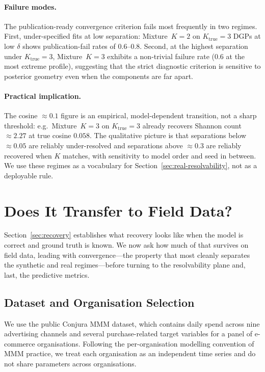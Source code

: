 \documentclass[11pt]{article}
\begin{document}
\paragraph{Failure modes.} The publication-ready convergence criterion fails most frequently in two regimes. First, under-specified fits at low separation: Mixture~$K=2$ on $K_{\text{true}}=3$ DGPs at low $\delta$ shows publication-fail rates of $0.6$--$0.8$. Second, at the highest separation under $K_{\text{true}}=3$, Mixture~$K=3$ exhibits a non-trivial failure rate ($0.6$ at the most extreme profile), suggesting that the strict diagnostic criterion is sensitive to posterior geometry even when the components are far apart.

\paragraph{Practical implication.} The cosine $\approx 0.1$ figure is an empirical, model-dependent transition, not a sharp threshold: e.g.\ Mixture~$K=3$ on $K_{\text{true}}=3$ already recovers Shannon count $\approx 2.27$ at true cosine $0.058$. The qualitative picture is that separations below $\approx 0.05$ are reliably under-resolved and separations above $\approx 0.3$ are reliably recovered when $K$ matches, with sensitivity to model order and seed in between. We use these regimes as a vocabulary for Section~\ref{sec:real-resolvability}, not as a deployable rule.

\section{Does It Transfer to Field Data?}
\label{sec:real}

Section~\ref{sec:recovery} establishes what recovery looks like when the model is correct and ground truth is known. We now ask how much of that survives on field data, leading with convergence---the property that most cleanly separates the synthetic and real regimes---before turning to the resolvability plane and, last, the predictive metrics.

\subsection{Dataset and Organisation Selection}

We use the public Conjura MMM dataset, which contains daily spend across nine advertising channels and several purchase-related target variables for a panel of e-commerce organisations. Following the per-organisation modelling convention of MMM practice, we treat each organisation as an independent time series and do not share parameters across organisations.
\end{document}
